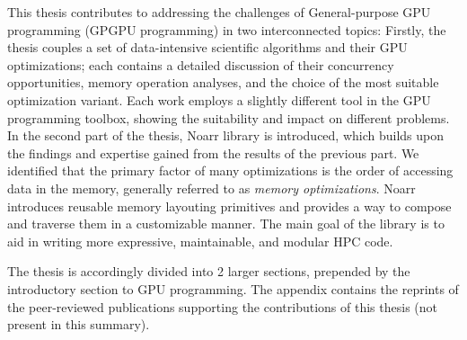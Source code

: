 
This thesis contributes to addressing the challenges of General-purpose GPU programming (GPGPU programming) in two interconnected topics:
Firstly, the thesis couples a set of data-intensive scientific algorithms and their GPU optimizations; each contains a detailed discussion of their concurrency opportunities, memory operation analyses, and the choice of the most suitable optimization variant. Each work employs a slightly different tool in the GPU programming toolbox, showing the suitability and impact on different problems.
In the second part of the thesis, Noarr library is introduced, which builds upon the findings and expertise gained from the results of the previous part. We identified that the primary factor of many optimizations is the order of accessing data in the memory, generally referred to as \emph{memory optimizations}.
Noarr introduces reusable memory layouting primitives and provides a way to compose and traverse them in a customizable manner. The main goal of the library is to aid in writing more expressive, maintainable, and modular HPC code.

The thesis is accordingly divided into 2 larger sections, prepended by the introductory section to GPU programming. The appendix contains the reprints of the peer-reviewed publications supporting the contributions of this thesis (not present in this summary).